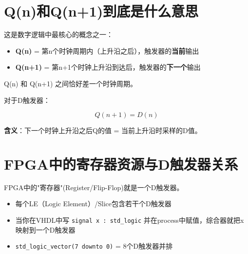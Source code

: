 \section{Q(n)和Q(n+1)到底是什么意思}

这是数字逻辑中最核心的概念之一：

\begin{definition}[Q(n) vs Q(n+1)]
\begin{itemize}
  \item \textbf{Q(n)} = 第n个时钟周期内（上升沿之后），触发器的\textbf{当前}输出
  \item \textbf{Q(n+1)} = 第n+1个时钟上升沿到达后，触发器的\textbf{下一个}输出
\end{itemize}

Q(n) 和 Q(n+1) 之间恰好差一个时钟周期。
\end{definition}

对于D触发器：

\begin{equation}
  \boxed{Q(n+1) = D(n)}
\end{equation}

\textbf{含义}：下一个时钟上升沿之后Q的值 = 当前上升沿时采样的D值。

\begin{center}
\end{center}

\section{FPGA中的寄存器资源与D触发器关系}

\begin{keypoint}[FPGA寄存器的本质]
FPGA中的"寄存器"(Register/Flip-Flop)就是一个D触发器。

\begin{itemize}
  \item 每个LE（Logic Element）/Slice包含若干个D触发器
  \item 当你在VHDL中写 \texttt{signal x : std\_logic} 并在process中赋值，综合器就把x映射到一个D触发器
  \item \texttt{std\_logic\_vector(7 downto 0)} = 8个D触发器并排
\end{itemize}
\end{keypoint}

